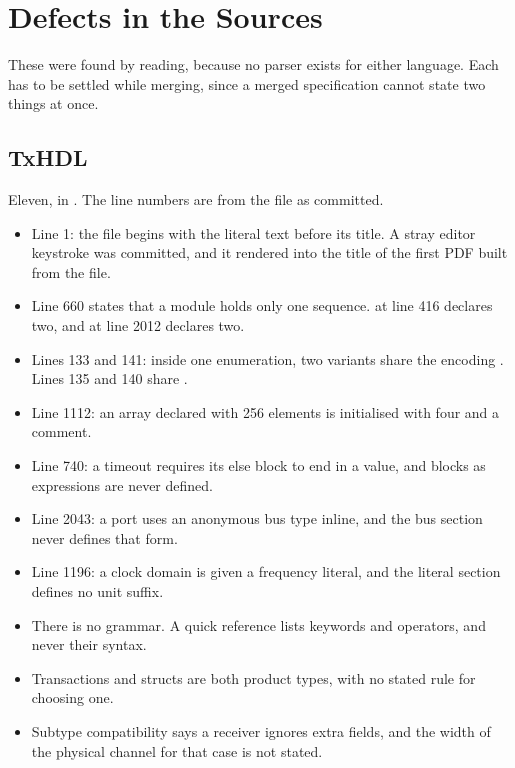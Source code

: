 \section{Defects in the Sources}
\label{sec:defects}

These were found by reading, because no parser exists for either language.
Each has to be settled while merging, since a merged specification cannot
state two things at once.

\subsection{TxHDL}

Eleven, in . The line numbers are from the file as
committed.

\begin{itemize}
  \item Line 1: the file begins with the literal text  before
        its title. A stray editor keystroke was committed, and it rendered
        into the title of the first PDF built from the file.
  \item Line 660 states that a module holds only one sequence.
         at line 416 declares two, and
         at line 2012 declares two.
  \item Lines 133 and 141: inside one enumeration, two variants share the
        encoding . Lines 135 and 140 share .
  \item Line 1112: an array declared with 256 elements is initialised with
        four and a comment.
  \item Line 740: a timeout requires its else block to end in a value, and
        blocks as expressions are never defined.
  \item Line 2043: a port uses an anonymous bus type inline, and the bus
        section never defines that form.
  \item Line 1196: a clock domain is given a frequency literal, and the
        literal section defines no unit suffix.
  \item There is no grammar. A quick reference lists keywords and
        operators, and never their syntax.
  \item Transactions and structs are both product types, with no stated
        rule for choosing one.
  \item Subtype compatibility says a receiver ignores extra fields, and the
        width of the physical channel for that case is not stated.
\end{itemize}


